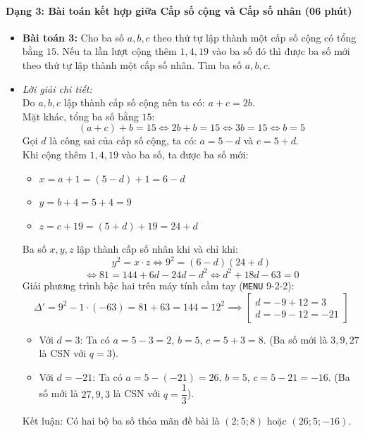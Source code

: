 \documentclass[12pt, a4paper]{article}
\begin{document}
\paragraph{Dạng 3: Bài toán kết hợp giữa Cấp số cộng và Cấp số nhân (06 phút)}
\begin{itemize}
    \item \textbf{Bài toán 3:} Cho ba số $a, b, c$ theo thứ tự lập thành một cấp số cộng có tổng bằng $15$. Nếu ta lần lượt cộng thêm $1, 4, 19$ vào ba số đó thì được ba số mới theo thứ tự lập thành một cấp số nhân. Tìm ba số $a, b, c$.
    \item \textit{Lời giải chi tiết:}\\
    Do $a, b, c$ lập thành cấp số cộng nên ta có: $a + c = 2b$.\\
    Mặt khác, tổng ba số bằng $15$:
    $$(a + c) + b = 15 \iff 2b + b = 15 \iff 3b = 15 \iff b = 5$$
    Gọi $d$ là công sai của cấp số cộng, ta có: $a = 5 - d$ và $c = 5 + d$.\\
    Khi cộng thêm $1, 4, 19$ vào ba số, ta được ba số mới:
    \begin{itemize}
        \item $x = a + 1 = (5 - d) + 1 = 6 - d$
        \item $y = b + 4 = 5 + 4 = 9$
        \item $z = c + 19 = (5 + d) + 19 = 24 + d$
    \end{itemize}
    Ba số $x, y, z$ lập thành cấp số nhân khi và chỉ khi:
    $$y^2 = x \cdot z \iff 9^2 = (6 - d)(24 + d)$$
    $$\iff 81 = 144 + 6d - 24d - d^2 \iff d^2 + 18d - 63 = 0$$
    Giải phương trình bậc hai trên máy tính cầm tay (\texttt{MENU} 9-2-2):
    $$\Delta' = 9^2 - 1 \cdot (-63) = 81 + 63 = 144 = 12^2 \implies \begin{bmatrix} d = -9 + 12 = 3 \\ d = -9 - 12 = -21 \end{bmatrix}$$
    \begin{itemize}
        \item Với $d = 3$: Ta có $a = 5 - 3 = 2$, $b = 5$, $c = 5 + 3 = 8$. (Ba số mới là $3, 9, 27$ là CSN với $q = 3$).
        \item Với $d = -21$: Ta có $a = 5 - (-21) = 26$, $b = 5$, $c = 5 - 21 = -16$. (Ba số mới là $27, 9, 3$ là CSN với $q = \dfrac{1}{3}$).
    \end{itemize}
    Kết luận: Có hai bộ ba số thỏa mãn đề bài là $(2; 5; 8)$ hoặc $(26; 5; -16)$.
\end{itemize}
\end{document}
